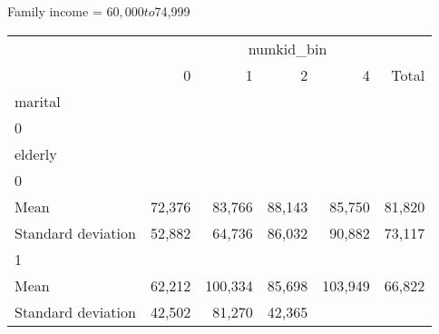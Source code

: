 Family income = $60,000 to $74,999
\begin{tabular}{llllll}
\cline{1-6}
\multicolumn{1}{c}{} &
  \multicolumn{5}{|c}{numkid\_bin} \\
\multicolumn{1}{c}{} &
  \multicolumn{1}{|r}{0} &
  \multicolumn{1}{r}{1} &
  \multicolumn{1}{r}{2} &
  \multicolumn{1}{r}{4} &
  \multicolumn{1}{r}{Total} \\
\cline{1-6}
\multicolumn{1}{l}{marital} &
  \multicolumn{1}{|r}{} &
  \multicolumn{1}{r}{} &
  \multicolumn{1}{r}{} &
  \multicolumn{1}{r}{} &
  \multicolumn{1}{r}{} \\
\multicolumn{1}{l}{\hspace{1em}0} &
  \multicolumn{1}{|r}{} &
  \multicolumn{1}{r}{} &
  \multicolumn{1}{r}{} &
  \multicolumn{1}{r}{} &
  \multicolumn{1}{r}{} \\
\multicolumn{1}{l}{\hspace{2em}elderly} &
  \multicolumn{1}{|r}{} &
  \multicolumn{1}{r}{} &
  \multicolumn{1}{r}{} &
  \multicolumn{1}{r}{} &
  \multicolumn{1}{r}{} \\
\multicolumn{1}{l}{\hspace{3em}0} &
  \multicolumn{1}{|r}{} &
  \multicolumn{1}{r}{} &
  \multicolumn{1}{r}{} &
  \multicolumn{1}{r}{} &
  \multicolumn{1}{r}{} \\
\multicolumn{1}{l}{\hspace{4em}Mean} &
  \multicolumn{1}{|r}{72,376} &
  \multicolumn{1}{r}{83,766} &
  \multicolumn{1}{r}{88,143} &
  \multicolumn{1}{r}{85,750} &
  \multicolumn{1}{r}{81,820} \\
\multicolumn{1}{l}{\hspace{4em}Standard deviation} &
  \multicolumn{1}{|r}{52,882} &
  \multicolumn{1}{r}{64,736} &
  \multicolumn{1}{r}{86,032} &
  \multicolumn{1}{r}{90,882} &
  \multicolumn{1}{r}{73,117} \\
\multicolumn{1}{l}{\hspace{3em}1} &
  \multicolumn{1}{|r}{} &
  \multicolumn{1}{r}{} &
  \multicolumn{1}{r}{} &
  \multicolumn{1}{r}{} &
  \multicolumn{1}{r}{} \\
\multicolumn{1}{l}{\hspace{4em}Mean} &
  \multicolumn{1}{|r}{62,212} &
  \multicolumn{1}{r}{100,334} &
  \multicolumn{1}{r}{85,698} &
  \multicolumn{1}{r}{103,949} &
  \multicolumn{1}{r}{66,822} \\
\multicolumn{1}{l}{\hspace{4em}Standard deviation} &
  \multicolumn{1}{|r}{42,502} &
  \multicolumn{1}{r}{81,270} &
  \multicolumn{1}{r}{42,365} &

\end{tabular}
